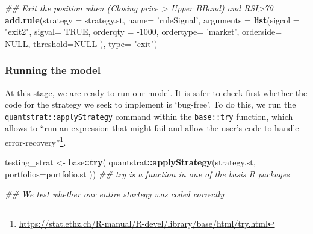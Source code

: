 \documentclass[
  11pt,
]{article}
\newenvironment{Shaded}{\begin{snugshade}}{\end{snugshade}}
\newcommand{\CommentTok}[1]{\textcolor[rgb]{0.56,0.35,0.01}{\textit{#1}}}
\newcommand{\DataTypeTok}[1]{\textcolor[rgb]{0.13,0.29,0.53}{#1}}
\newcommand{\DecValTok}[1]{\textcolor[rgb]{0.00,0.00,0.81}{#1}}
\newcommand{\KeywordTok}[1]{\textcolor[rgb]{0.13,0.29,0.53}{\textbf{#1}}}
\newcommand{\NormalTok}[1]{#1}
\newcommand{\OperatorTok}[1]{\textcolor[rgb]{0.81,0.36,0.00}{\textbf{#1}}}
\newcommand{\OtherTok}[1]{\textcolor[rgb]{0.56,0.35,0.01}{#1}}
\newcommand{\StringTok}[1]{\textcolor[rgb]{0.31,0.60,0.02}{#1}}
\begin{document}
\begin{Shaded}
\begin{Highlighting}[]
\CommentTok{## Exit the position when (Closing price > Upper BBand) and RSI>70  }
\KeywordTok{add.rule}\NormalTok{(}\DataTypeTok{strategy =}\NormalTok{ strategy.st, }\DataTypeTok{name=} \StringTok{'ruleSignal'}\NormalTok{,}
         \DataTypeTok{arguments =} \KeywordTok{list}\NormalTok{(}\DataTypeTok{sigcol =} \StringTok{"exit2"}\NormalTok{, }\DataTypeTok{sigval=} \OtherTok{TRUE}\NormalTok{,}
                          \DataTypeTok{orderqty =} \DecValTok{-1000}\NormalTok{, }\DataTypeTok{ordertype=} \StringTok{'market'}\NormalTok{, }\DataTypeTok{orderside=} \OtherTok{NULL}\NormalTok{,}
                          \DataTypeTok{threshold=}\OtherTok{NULL}\NormalTok{ ),  }
         \DataTypeTok{type=} \StringTok{"exit"}\NormalTok{)}
\end{Highlighting}
\end{Shaded}

\hypertarget{running-the-model}{%
\subsubsection{Running the model}\label{running-the-model}}

At this stage, we are ready to run our model. It is safer to check first
whether the code for the strategy we seek to implement is `bug-free'. To
do this, we run the \texttt{quantstrat::applyStrategy} command within
the \texttt{base::try} function, which allows to ``run an expression
that might fail and allow the user's code to handle
error-recovery''\footnote{\url{https://stat.ethz.ch/R-manual/R-devel/library/base/html/try.html}}.

\begin{Shaded}
\begin{Highlighting}[]
\NormalTok{testing_strat <-}\StringTok{ }\NormalTok{base}\OperatorTok{::}\KeywordTok{try}\NormalTok{( quantstrat}\OperatorTok{::}\KeywordTok{applyStrategy}\NormalTok{(strategy.st,}
                        \DataTypeTok{portfolios=}\NormalTok{portfolio.st ))}
\CommentTok{## try is a function in one of the basis R packages}

\CommentTok{## We test whether our entire startegy was coded correctly }
\end{Highlighting}
\end{Shaded}
\end{document}
